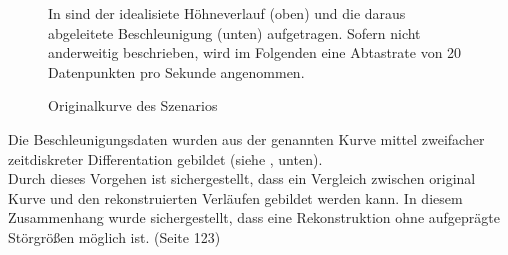 \begin{figure}[ht!]
\vspace{0.25cm}
\begin{center}
\caption{Originalkurve des Szenarios}
\label{fig:SzeneOrigin}
\end{center}

\vspace{0.25cm}
In  sind der idealisiete Höhneverlauf (oben) und die daraus abgeleitete Beschleunigung (unten) aufgetragen. Sofern nicht anderweitig beschrieben, wird im Folgenden eine Abtastrate von 20 Datenpunkten pro Sekunde angenommen.
\end{figure}

Die Beschleunigungsdaten wurden aus der genannten Kurve mittel zweifacher zeitdiskreter Differentation gebildet (siehe , unten).\\
Durch dieses Vorgehen ist sichergestellt, dass ein Vergleich zwischen original Kurve und den rekonstruierten Verläufen gebildet werden kann. In diesem Zusammenhang wurde sichergestellt, dass eine Rekonstruktion ohne aufgeprägte Störgrößen möglich ist. (Seite 123)

